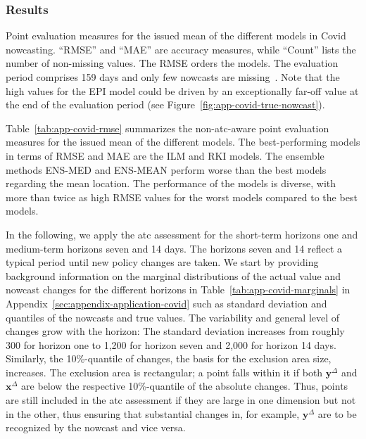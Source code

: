 \documentclass[pdflatex]{sn-jnl}
\theoremstyle{plain}%
\theoremstyle{definition}
\newcommand{\diffx}{\mathbf{x}^{\Delta}}
\newcommand{\diffy}{\mathbf{y}^{\Delta}}
\begin{document}
\subsubsection*{Results}

\begin{table}
    \centering
    
    \caption[Point evaluation measures for the issued mean of the different models in Covid nowcasting.]{Point evaluation measures for the issued mean of the different models in Covid nowcasting. \enquote{RMSE} and \enquote{MAE} are accuracy measures, while \enquote{Count} lists the number of non-missing values. The RMSE orders the models. The evaluation period comprises 159 days and only few nowcasts are missing~\citep[for explanations of the missing values, see][Tables A2, A3, and A4]{Wolffram2023}. Note that the high values for the EPI model could be driven by an exceptionally far-off value at the end of the evaluation period (see Figure~\ref{fig:app-covid-true-nowcast}).}
    \label{tab:app-covid-rmse}
\end{table}

Table~\ref{tab:app-covid-rmse} summarizes the non-\ac{atc}-aware point evaluation measures for the issued mean of the different models.
The best-performing models in terms of RMSE and MAE are the ILM and RKI models.
The ensemble methods ENS-MED and ENS-MEAN perform worse than the best models regarding the mean location.
The performance of the models is diverse, with more than twice as high RMSE values for the worst models compared to the best models.

In the following, we apply the \ac{atc} assessment for the short-term horizons one and medium-term horizons seven and 14 days.
The horizons seven and 14 reflect a typical period until new policy changes are taken.
We start by providing background information on the marginal distributions of the actual value and nowcast changes for the different horizons in Table~\ref{tab:app-covid-marginals} in Appendix~\ref{sec:appendix-application-covid} such as standard deviation and quantiles of the nowcasts and true values.
The variability and general level of changes grow with the horizon: The standard deviation increases from roughly 300 for horizon one to 1,200 for horizon seven and 2,000 for horizon 14 days.
Similarly, the 10\%-quantile of changes, the basis for the exclusion area size, increases.
The exclusion area is rectangular; a point falls within it if both $\diffy$ and $\diffx$ are below the respective 10\%-quantile of the absolute changes.
Thus, points are still included in the \ac{atc} assessment if they are large in one dimension but not in the other, thus ensuring that substantial changes in, for example, $\diffy$ are to be recognized by the nowcast and vice versa.
\end{document}
